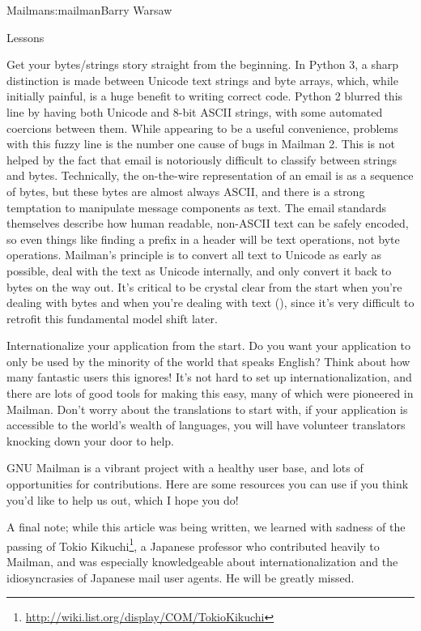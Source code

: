 \begin{aosachapter}{Mailman}{s:mailman}{Barry Warsaw}
\begin{aosasect1}{Lessons}
\begin{aosaitemize}
\item Get your bytes/strings story straight from the beginning.  In
  Python 3, a sharp distinction is made between Unicode text strings
  and byte arrays, which, while initially painful, is a huge benefit
  to writing correct code.  Python 2 blurred this line by having both
  Unicode and 8-bit ASCII strings, with some automated coercions
  between them.  While appearing to be a useful convenience, problems
  with this fuzzy line is the number one cause of bugs in Mailman 2.
  This is not helped by the fact that email is notoriously difficult
  to classify between strings and bytes.  Technically, the on-the-wire
  representation of an email is as a sequence of bytes, but these
  bytes are almost always ASCII, and there is a strong temptation to
  manipulate message components as text.  The email standards
  themselves describe how human readable, non-ASCII text can be safely
  encoded, so even things like finding a  prefix in a
   header will be text operations, not byte operations.
  Mailman's principle is to convert all text to Unicode as early as
  possible, deal with the text as Unicode internally, and only convert
  it back to bytes on the way out.  It's critical to be crystal clear
  from the start when you're dealing with bytes and when you're
  dealing with text (), since it's very difficult to
  retrofit this fundamental model shift later.

\item Internationalize your application from the start.  Do you want
  your application to only be used by the minority of the world that
  speaks English?  Think about how many fantastic users this ignores!
  It's not hard to set up internationalization, and there are lots of
  good tools for making this easy, many of which were pioneered in
  Mailman.  Don't worry about the translations to start with, if your
  application is accessible to the world's wealth of languages, you
  will have volunteer translators knocking down your door to help.

\end{aosaitemize}

GNU Mailman is a vibrant project with a healthy user base, and lots of
opportunities for contributions.  Here are some resources you can use
if you think you'd like to help us out, which I hope you do!

A final note; while this article was being written, we learned with
sadness of the passing of Tokio
Kikuchi\footnote{\url{http://wiki.list.org/display/COM/TokioKikuchi}},
a Japanese professor who contributed heavily to Mailman, and was
especially knowledgeable about internationalization and the
idiosyncrasies of Japanese mail user agents.  He will be greatly
missed.


\end{aosasect1}
\end{aosachapter}
